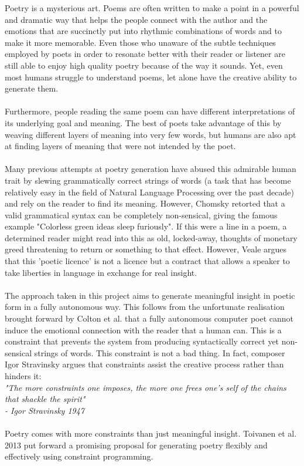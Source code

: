 Poetry is a mysterious art. Poems are often written to make a point in a powerful and dramatic way that helps the people connect with the author and the emotions that are succinctly put into rhythmic combinations of words and to make it more memorable. Even those who unaware of the subtle techniques employed by poets in order to resonate better with their reader or listener are still able to enjoy high quality poetry because of the way it sounds. Yet, even most humans struggle to understand poems, let alone have the creative ability to generate them.
\\\\
Furthermore, people reading the same poem can have different interpretations of its underlying goal and meaning. The best of poets take advantage of this by weaving different layers of meaning into very few words, but humans are also apt at finding layers of meaning that were not intended by the poet.
\\\\
Many previous attempts at poetry generation have abused this admirable human trait by slewing grammatically correct strings of words (a task that has become relatively easy in the field of Natural Language Processing over the past decade) and rely on the reader to find its meaning. However, Chomsky retorted that a valid grammatical syntax can be completely non-sensical, giving the famous example "Colorless green ideas sleep furiously". If this were a line in a poem, a determined reader might read into this as old, locked-away, thoughts of monetary greed threatening to return or something to that effect. However, Veale argues that this 'poetic licence' is not a licence but a contract that allows a speaker to take liberties in language in exchange for real insight.
\\\\
The approach taken in this project aims to generate meaningful insight in poetic form in a fully autonomous way. This follows from the unfortunate realisation brought forward by Colton et al. that a fully autonomous computer poet cannot induce the emotional connection with the reader that a human can. This is a constraint that prevents the system from producing syntactically correct yet non-sensical strings of words. This constraint is not a bad thing. In fact, composer Igor Stravinsky argues that constraints assist the creative process rather than hinders it:\\
\textit{"The more constraints one imposes, the more one frees one's self of the chains that shackle the spirit"\\ \hfill{- Igor Stravinsky 1947}}
\\\\
Poetry comes with more constraints than just meaningful insight. 
Toivanen et al. 2013 put forward a promising proposal for generating poetry flexibly and effectively using constraint programming.

